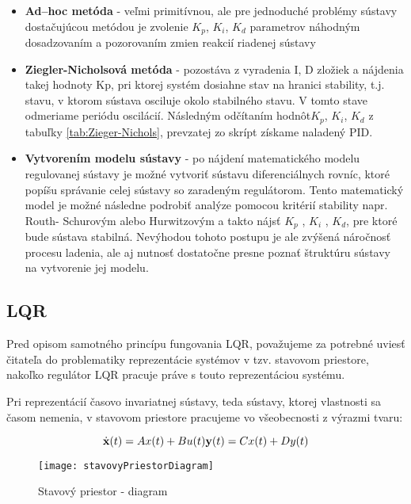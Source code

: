 \begin{itemize}
\item \textbf{Ad–hoc metóda} - veľmi primitívnou, ale pre jednoduché problémy sústavy dostačujúcou metódou je zvolenie $K_p$, $K_i$, $K_d$ parametrov náhodným dosadzovaním a pozorovaním zmien reakcií riadenej sústavy
\item \textbf{Ziegler-Nicholsová metóda} - pozostáva z vyradenia I, D zložiek a nájdenia takej hodnoty Kp, pri ktorej systém dosiahne stav na hranici stability, t.j. stavu, v ktorom sústava osciluje okolo stabilného stavu. V tomto stave odmeriame periódu oscilácií. Následným odčítaním hodnôt$K_p$, $K_i$, $K_d$ z tabuľky \ref{tab:Zieger-Nichols}, prevzatej zo skrípt\cite{SKRIPTA} získame naladený PID.
\item \textbf{Vytvorením modelu sústavy} - po nájdení matematického modelu regulovanej 	sústavy je možné vytvoriť sústavu diferenciálnych rovníc, ktoré popíšu správanie celej sústavy so zaradeným regulátorom. Tento matematický model je možné následne podrobiť analýze pomocou kritérií stability napr. Routh-	Schurovým alebo Hurwitzovým a takto nájsť  $K_p$ , $K_i$ , $K_d$, pre ktoré bude sústava stabilná. Nevýhodou tohoto postupu je ale zvýšená náročnosť procesu ladenia, ale aj nutnosť dostatočne presne poznať štruktúru sústavy na 	vytvorenie jej modelu.  
\end{itemize}

\subsection{LQR}

Pred opisom samotného princípu fungovania LQR, považujeme za potrebné uviesť čitateľa do problematiky reprezentácie systémov v tzv. stavovom priestore, nakoľko regulátor LQR pracuje práve s touto reprezentáciou systému.

Pri reprezentácií časovo invariatnej sústavy, teda sústavy, ktorej vlastnosti sa časom nemenia, v stavovom priestore pracujeme vo všeobecnosti z výrazmi tvaru:

\begin{equation}
\dot {\textbf{x}}(t) = Ax(t) + Bu(t) \linebreak
\textbf {y}(t) = Cx(t) + Dy(t)  
\end{equation}
\newpage
\begin{figure}
\centering
\texttt{[image: stavovyPriestorDiagram]}
\caption{Stavový priestor - diagram}
\label{fig:stavovyPriestorDiagram}
\end{figure}

